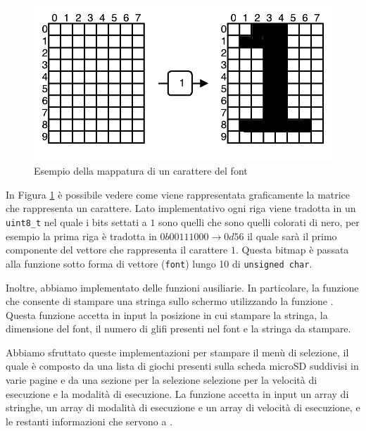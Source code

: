 \documentclass[a4paper]{article}
\begin{document}
\begin{figure}[h!t]
    \begin{center}
        \includegraphics[scale=0.5]{./figures/matrix_font.pdf}
    \end{center}
    \caption{Esempio della mappatura di un carattere del font}
    \label{fig:matrix_font}
\end{figure}

In Figura \ref{fig:matrix_font} è possibile vedere come viene rappresentata graficamente
la matrice che rappresenta un carattere. Lato implementativo ogni riga viene tradotta in
un \texttt{uint8\_t} nel quale i bits settati a $1$ sono quelli che sono quelli colorati di nero,
per esempio la prima riga è tradotta in $0b00111000 \rightarrow 0d56$ il quale sarà il primo
componente del vettore che rappresenta il carattere $1$. Questa bitmap è passata alla
funzione
{}
sotto forma di vettore (\texttt{font}) lungo 10 di \texttt{unsigned char}.

Inoltre, abbiamo implementato delle funzioni ausiliarie. In particolare, la funzione
{}
che consente di stampare una stringa sullo schermo utilizzando la funzione
{}. Questa funzione accetta in input
la posizione in cui stampare la stringa, la dimensione del font, il numero di glifi presenti
nel font e la stringa da stampare.

Abbiamo sfruttato queste implementazioni per stampare il menù di selezione, il quale
è composto da una lista di giochi presenti sulla scheda microSD suddivisi in varie pagine
e da una sezione per la selezione selezione per la velocità di esecuzione e la modalità
di esecuzione. La funzione accetta in input un array di stringhe, un array di modalità di
esecuzione e un array di velocità di esecuzione, e le restanti informazioni che servono
a {}.
\end{document}
